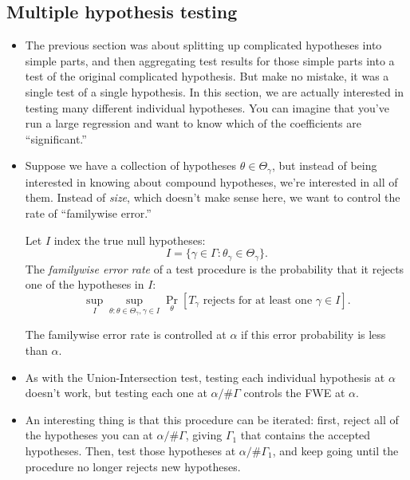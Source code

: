 \subsection{Multiple hypothesis testing}

\begin{itemize}[leftmargin=0pt]

\item The previous section was about splitting up complicated
  hypotheses into simple parts, and then aggregating test results for
  those simple parts into a test of the original complicated
  hypothesis. But make no mistake, it was a single test of a single
  hypothesis. In this section, we are actually interested in testing
  many different individual hypotheses. You can imagine that you've
  run a large regression and want to know which of the coefficients
  are ``significant.''

\item Suppose we have a collection of hypotheses $\theta \in
  \Theta_\gamma$, but instead of being interested in knowing about
  compound hypotheses, we're interested in all of them. Instead of
  \emph{size}, which doesn't make sense here, we want to control the
  rate of ``familywise error.''
  \begin{defn}
    Let $I$ index the true null hypotheses:
    \begin{equation*}
      I = \{\gamma \in \Gamma : \theta_\gamma \in \Theta_\gamma\}.
    \end{equation*}
    The \emph{familywise error rate} of a test procedure is the
    probability that it rejects one of the hypotheses in $I$:
    \begin{equation*}
      \sup_I \sup_{\theta: \theta \in \Theta_\gamma, \gamma \in I}
      \Pr_\theta[T_\gamma \text{ rejects for at least one } \gamma \in I].
    \end{equation*}
  \end{defn}

  The familywise error rate is controlled at $\alpha$ if this error
  probability is less than $\alpha$.

\item As with the Union-Intersection test, testing each individual
  hypothesis at $\alpha$ doesn't work, but testing each one at
  $\alpha / \# \Gamma$ controls the FWE at $\alpha$.

\item An interesting thing is that this procedure can be iterated:
  first, reject all of the hypotheses you can at $\alpha/\#\Gamma$,
  giving $\Gamma_1$ that contains the accepted hypotheses.  Then, test
  those hypotheses at $\alpha/\#\Gamma_1$, and keep going until the
  procedure no longer rejects new hypotheses.


\end{itemize}
